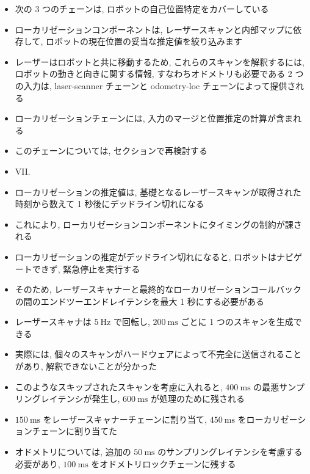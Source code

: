 \begin{frame}{}
    \begin{itemize}
        \item 次の 3 つのチェーンは, ロボットの自己位置特定をカバーしている
\item ローカリゼーションコンポーネントは, レーザースキャンと内部マップに依存して, ロボットの現在位置の妥当な推定値を絞り込みます
\item レーザーはロボットと共に移動するため, これらのスキャンを解釈するには, ロボットの動きと向きに関する情報, すなわちオドメトリも必要である 2 つの入力は, laser-scanner チェーンと odometry-loc チェーンによって提供される
\item ローカリゼーションチェーンには, 入力のマージと位置推定の計算が含まれる
\item このチェーンについては, セクションで再検討する
\item VII.
    \end{itemize}
\end{frame}

\begin{frame}{}
    \begin{itemize}
        \item ローカリゼーションの推定値は, 基礎となるレーザースキャンが取得された時刻から数えて 1 秒後にデッドライン切れになる
\item これにより, ローカリゼーションコンポーネントにタイミングの制約が課される
\item ローカリゼーションの推定がデッドライン切れになると, ロボットはナビゲートできず, 緊急停止を実行する
\item そのため, レーザースキャナーと最終的なローカリゼーションコールバックの間のエンドツーエンドレイテンシを最大 1 秒にする必要がある
    \end{itemize}
\end{frame}

\begin{frame}{}
    \begin{itemize}
        \item レーザースキャナは $5 \mathrm{~Hz}$ で回転し, $200 \mathrm{~ms}$ ごとに 1 つのスキャンを生成できる
\item 実際には, 個々のスキャンがハードウェアによって不完全に送信されることがあり, 解釈できないことが分かった
\item このようなスキップされたスキャンを考慮に入れると, $400 \mathrm{~ms}$ の最悪サンプリングレイテンシが発生し, $600 \mathrm{~ms}$ が処理のために残される
\item $150 \mathrm{~ms}$ をレーザースキャナーチェーンに割り当て, $450 \mathrm{~ms}$ をローカリゼーションチェーンに割り当てた
\item オドメトリについては, 追加の $50 \mathrm{~ms}$ のサンプリングレイテンシを考慮する必要があり, $100 \mathrm{~ms}$ をオドメトリロックチェーンに残する
    \end{itemize}
\end{frame}

